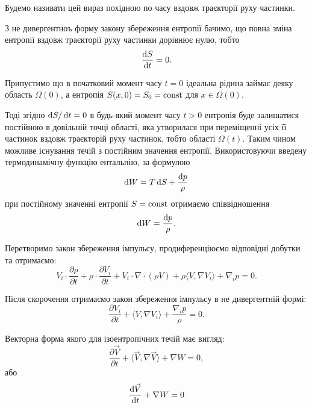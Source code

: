 Будемо називати цей вираз похідною по часу вздовж траєкторії руху частинки. \medskip

З не дивергентноъ форму закону збереження ентропії бачимо, що повна зміна ентропії вздовж траєкторії руху частинки дорівнює нулю, тобто
\begin{equation}
	\frac{\mathop{}\!\mathrm{d} S}{\mathop{}\!\mathrm{d} t} = 0.
\end{equation}

Припустимо що в початковий момент часу $t = 0$ ідеальна рідина займає деяку область $\Omega(0)$, а ентропія $S(x, 0) = S_0 = \operatorname{const}$ для $x \in \Omega(0)$. \medskip
 
Тоді згідно $\mathop{}\!\mathrm{d} S / \mathop{}\!\mathrm{d} t = 0$ в будь-який момент часу $t > 0$ ентропія буде залишатися постійною в довільній точці області, яка утворилася при переміщенні усіх її частинок вздовж траєкторій руху частинок, тобто області $\Omega(t)$. Таким чином можливе існування течій з постійним значення ентропії. Використовуючи введену термодинамічну функцію ентальпію, за формулою
\begin{equation}
	\mathop{}\!\mathrm{d} W = T \mathop{}\!\mathrm{d} S + \frac{\mathop{}\!\mathrm{d} p}{\rho}
\end{equation}
при постійному значенні ентропії $S = \operatorname{const}$ отримаємо співвідношення 
\begin{equation}
	\mathop{}\!\mathrm{d} W = \frac{\mathop{}\!\mathrm{d} p}{\rho}.	
\end{equation}

Перетворимо закон збереження імпульсу, продиференціюємо відповідні добутки та отримаємо:
\begin{equation}
	V_i \cdot \frac{\partial \rho}{\partial t} + \rho \cdot \frac{\partial V_i}{\partial t} + V_i \cdot \nabla \cdot (\rho V) + \rho \langle V, \nabla V_i \rangle + \nabla_i p = 0.
\end{equation}

Після скорочення отримаємо закон збереження імпульсу в не дивергентній формі:
\begin{equation}
	\frac{\partial V_i}{\partial t} + \langle V, \nabla V_i \rangle + \frac{\nabla_i p}{\rho} = 0.
\end{equation}

Векторна форма якого для ізоентропічних течій має вигляд:
\begin{equation}
	\frac{\partial \vec V}{\partial t} + \langle \vec V, \nabla \vec V \rangle + \nabla W = 0,
\end{equation}
або
\begin{equation}
	\frac{\mathop{}\!\mathrm{d} \vec V}{\mathop{}\!\mathrm{d} t} + \nabla W = 0
\end{equation}

